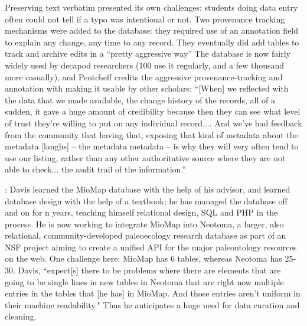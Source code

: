 Preserving text verbatim presented its own challenges: students doing data entry often could not tell if a typo was intentional or not. Two provenance tracking mechanisms were added to the database:
they required use of an annotation field to explain any change, any time to any record.
They eventually did add tables to track and archive edits in a “pretty aggressive way”
The database is now fairly widely used by decapod researchers (100 use it regularly, and a few thousand more casually), and Pentcheff credits the aggressive provenance-tracking and annotation with making it usable by other scholars:
“[When] we reflected with the data that we made available, the change history of the records, all of a sudden, it gave a huge amount of credibility because then they can see what level of trust they're willing to put on any individual record.... And we've had feedback from the community that having that, exposing that kind of metadata about the metadata [laughs] – the metadata metadata – is why they will very often tend to use our listing, rather than any other authoritative source where they are not able to check... the audit trail of the information.”


: Davis learned the MioMap database with the help of his advisor, and learned database design with the help of a textbook; he has managed the database off and on for n years, teaching himself relational design, SQL and PHP in the process.  He is now working to integrate MioMap into Neotoma, a larger, also relational, community-developed paleoecology research database as part of an NSF project aiming to create a unified API for the major paleontology resources on the web.  One challenge here: MioMap has 6 tables, whereas Neotoma has 25-30. Davis, “expect[s] there to be problems where there are elements that are going to be single lines in new tables in Neotoma that are right now multiple entries in the tables that [he has] in MioMap. And those entries aren't uniform in their machine readability."  Thus he anticipates a huge need for data curation and cleaning.


